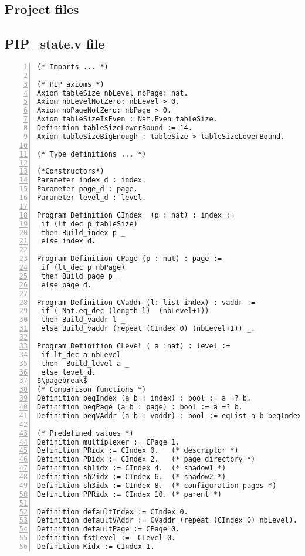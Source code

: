 \begin{appendices}

\chapter{Project files}

\section{PIP\_state.v file} \label{stateFile}
\begin{lstlisting}[xleftmargin=-.1\textwidth,
xrightmargin=-.1\textwidth,
mathescape=true,numbers=left]
(* Imports ... *)

(* PIP axioms *)
Axiom tableSize nbLevel nbPage: nat.
Axiom nbLevelNotZero: nbLevel > 0.
Axiom nbPageNotZero: nbPage > 0.
Axiom tableSizeIsEven : Nat.Even tableSize.
Definition tableSizeLowerBound := 14.  
Axiom tableSizeBigEnough : tableSize > tableSizeLowerBound. 

(* Type definitions ... *)

(*Constructors*)
Parameter index_d : index.
Parameter page_d : page.
Parameter level_d : level.

Program Definition CIndex  (p : nat) : index := 
 if (lt_dec p tableSize) 
 then Build_index p _ 
 else index_d.

Program Definition CPage (p : nat) : page := 
 if (lt_dec p nbPage) 
 then Build_page p _ 
 else page_d.

Program Definition CVaddr (l: list index) : vaddr := 
 if ( Nat.eq_dec (length l)  (nbLevel+1))  
 then Build_vaddr l _
 else Build_vaddr (repeat (CIndex 0) (nbLevel+1)) _.

Program Definition CLevel ( a :nat) : level := 
 if lt_dec a nbLevel 
 then  Build_level a _ 
 else level_d.
$\pagebreak$
(* Comparison functions *)
Definition beqIndex (a b : index) : bool := a =? b.
Definition beqPage (a b : page) : bool := a =? b.
Definition beqVAddr (a b : vaddr) : bool := eqList a b beqIndex.

(* Predefined values *)
Definition multiplexer := CPage 1.
Definition PRidx := CIndex 0.   (* descriptor *)
Definition PDidx := CIndex 2.   (* page directory *)
Definition sh1idx := CIndex 4.  (* shadow1 *) 
Definition sh2idx := CIndex 6.  (* shadow2 *)
Definition sh3idx := CIndex 8.  (* configuration pages *)
Definition PPRidx := CIndex 10. (* parent *)

Definition defaultIndex := CIndex 0.
Definition defaultVAddr := CVaddr (repeat (CIndex 0) nbLevel).
Definition defaultPage := CPage 0.
Definition fstLevel :=  CLevel 0.
Definition Kidx := CIndex 1.
\end{lstlisting}
\pagebreak

\end{appendices}
